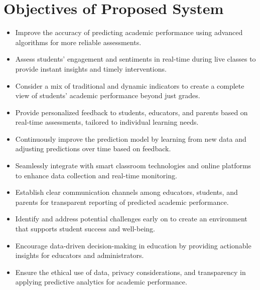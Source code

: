 \section{Objectives of Proposed System}
\begin{itemize}
   \item Improve the accuracy of predicting academic performance using advanced algorithms for more reliable assessments.
    \item Assess students' engagement and sentiments in real-time during live classes to provide instant insights and timely interventions.
    \item Consider a mix of traditional and dynamic indicators to create a complete view of students' academic performance beyond just grades.
    \item Provide personalized feedback to students, educators, and parents based on real-time assessments, tailored to individual learning needs.
    \item Continuously improve the prediction model by learning from new data and adjusting predictions over time based on feedback.
    \item Seamlessly integrate with smart classroom technologies and online platforms to enhance data collection and real-time monitoring.
    \item Establish clear communication channels among educators, students, and parents for transparent reporting of predicted academic performance.
    \item Identify and address potential challenges early on to create an environment that supports student success and well-being.
    \item Encourage data-driven decision-making in education by providing actionable insights for educators and administrators.
    \item Ensure the ethical use of data, privacy considerations, and transparency in applying predictive analytics for academic performance.
\end{itemize}

